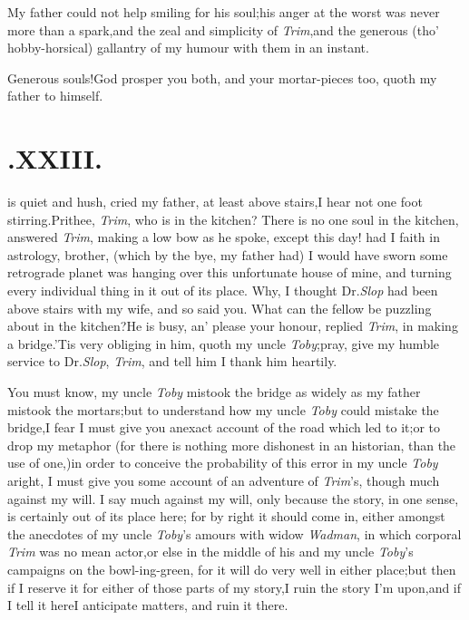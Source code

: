 \documentclass{article}
\begin{document}
My father could not help smiling for his soul;\tsk his anger at
the worst was ne\-ver more than a spark,\tsk and the zeal and
simplicity of \textit{Trim},\tsh and the generous
(tho’ hobby-horsical) gallantry of my\break 
{}
humour with them in an instant.

Generous souls!\tsk God prosper you both, and your mortar-pieces
too, quoth my father to himself.

\section{.\quad  XXIII.}

 is quiet and hush, cried my\break
father, at least above stairs,\tsk I\break
hear not one foot stirring.\tsh Prithee, \textit{Trim}, who is in
the kitchen?  There is no one soul in the kitchen, answered
\textit{Trim}, making a low bow as he spoke, except
this day! had I faith in astrology, bro\-ther, (which by
the bye, my father had)
I would have sworn some retrograde pla\-net was hanging over this
unfortunate house of mine, and turning every individual thing in
it out of its place.\tsh\break
Why, I thought Dr.\@ \textit{Slop} had been above stairs with my
wife, and so said you.\tsh\break
What can the fellow be puzzling about
in the kitchen?\tsk He is busy, an’ please your honour, replied
\textit{Trim}, in making a bridge.\tsh ’Tis very obliging in
him, quoth my uncle \textit{Toby};\tsh pray, give my humble
service to Dr.\@ \textit{Slop}, \textit{Trim}, and tell him I
thank him heartily.

You must know, my uncle \textit{Toby} mistook the bridge as
widely as my father mistook the mortars;\tsh but to
under\-stand how my uncle \textit{Toby} could mistake the
bridge,\tsk I fear I must give you an\break exact account of the road
which led to it;\tsk or to drop my metaphor (for
there is nothing more dishonest in an historian, than the use of
one,)\tsh in order to conceive the probability of this error in
my uncle \textit{Toby} aright, I must give you some account of
an adventure of \textit{Trim}’s, though much against my will. I
say much against my will, only because the story, in one sense,
is certainly out of its place here; for by right it should come
in, either amongst the anecdotes of my uncle \textit{Toby}’s
amours with widow \textit{Wadman}, in which corporal
\textit{Trim} was no mean actor,\tsk or else in the middle of his
and my uncle \textit{Toby}’s campaigns on the bowl-\break ing-green,\tsk
for it will do very well in either place;\tsk but then if I
reserve it for either of those parts of my story,\tsh I ruin the
story I’m upon,\tsk and if I tell it here\tsk I anticipate
matters, and ruin it there.
\end{document}
